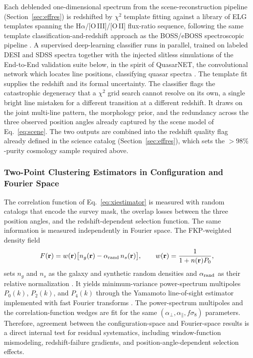 \documentclass[10pt,onecolumn]{article}
\newcommand{\fsig}{f\sigma_8}
\begin{document}
Each deblended one-dimensional spectrum from the scene-reconstruction pipeline (Section~\ref{sec:effres}) is redshifted by $\chi^2$ template fitting against a library of ELG templates spanning the H$\alpha$/[O\,III]/[O\,II] flux-ratio sequence, following the same template classification-and-redshift approach as the BOSS/eBOSS spectroscopic pipeline \cite{bolton2012}. A supervised deep-learning classifier runs in parallel, trained on labeled DESI and SDSS spectra together with the injected slitless simulations of the End-to-End validation suite below, in the spirit of QuasarNET, the convolutional network which locates line positions, classifying quasar spectra \cite{quasarnet2018}. The template fit supplies the redshift and its formal uncertainty. The classifier flags the catastrophic degeneracy that a $\chi^2$ grid search cannot resolve on its own, a single bright line mistaken for a different transition at a different redshift. It draws on the joint multi-line pattern, the morphology prior, and the redundancy across the three observed position angles already captured by the scene model of Eq.~\eqref{eq:scene}. The two outputs are combined into the redshift quality flag already defined in the science catalog (Section~\ref{sec:effres}), which sets the $>98\%$-purity cosmology sample required above.

\subsubsection{Two-Point Clustering Estimators in Configuration and Fourier Space}

The correlation function of Eq.~\eqref{eq:xiestimator} is measured with random catalogs that encode the survey mask, the overlap losses between the three position angles, and the redshift-dependent selection function. The same information is measured independently in Fourier space. The FKP-weighted density field
\begin{equation}
  F(\mathbf{r}) = w(\mathbf{r})\big[n_g(\mathbf{r})-\alpha_{\rm rand}\,n_s(\mathbf{r})\big],
  \qquad
  w(\mathbf{r}) = \frac{1}{1+n(\mathbf{r})P_0},
  \label{eq:fkp}
\end{equation}
sets $n_g$ and $n_s$ as the galaxy and synthetic random densities and $\alpha_{\rm rand}$ as their relative normalization \cite{fkp1994}. It yields minimum-variance power-spectrum multipoles $P_0(k)$, $P_2(k)$, and $P_4(k)$ through the Yamamoto line-of-sight estimator implemented with fast Fourier transforms \cite{yamamoto2006,hand2017nbodykit}. The power-spectrum multipoles and the correlation-function wedges are fit for the same $(\alpha_\perp,\alpha_\parallel,\fsig)$ parameters. Therefore, agreement between the configuration-space and Fourier-space results is a direct internal test for residual systematics, including window-function mismodeling, redshift-failure gradients, and position-angle-dependent selection effects.
\end{document}
